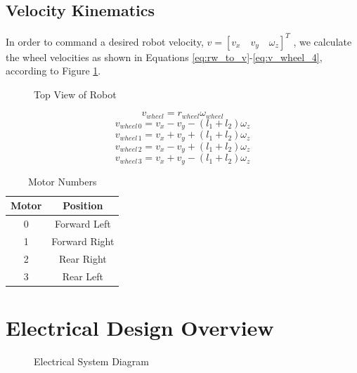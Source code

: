 \documentclass[letterpaper,12pt]{report}
\begin{document}
\subsection{Velocity Kinematics}
\label{sec:ar9331_vel_kin}

In order to command a desired robot velocity,
\begin{math}
    v= [ v_x \quad v_y \quad \omega_z ]^T
\end{math}
, we calculate the wheel velocities as shown in Equations
\ref{eq:rw_to_v}-\ref{eq:v_wheel_4}, according to Figure
\ref{fig:robot_top_view}.

\begin{figure}[h!]
  \centering
  
  \caption{Top View of Robot}
  \label{fig:robot_top_view}
\end{figure}

\begin{equation}
  v_{wheel}=r_{wheel}\omega_{wheel}
  \label{eq:rw_to_v}
\end{equation}
\begin{equation}
  v_{wheel\,0}=v_x-v_y-(l_1+l_2)\omega_z
  \label{eq:v_wheel_1}
\end{equation}
\begin{equation}
  v_{wheel\,1}=v_x+v_y+(l_1+l_2)\omega_z
  \label{eq:v_wheel_2}
\end{equation}
\begin{equation}
  v_{wheel\,2}=v_x-v_y+(l_1+l_2)\omega_z
  \label{eq:v_wheel_3}
\end{equation}
\begin{equation}
  v_{wheel\,3}=v_x+v_y-(l_1+l_2)\omega_z
  \label{eq:v_wheel_4}
\end{equation}

\begin{table}[h!]
  \centering
  \begin{tabular}{| c | c |}
    \hline
    \textbf{Motor} & \textbf{Position} \\
    \hline
    0 & Forward Left \\
    \hline
    1 & Forward Right \\
    \hline
    2 & Rear Right \\
    \hline
    3 & Rear Left \\
    \hline
  \end{tabular}
  \caption{Motor Numbers}
  \label{tab:motor_nums}
\end{table}

\section{Electrical Design Overview}
\begin{figure}[h!]
  \centering
  
  \caption{Electrical System Diagram}
  \label{fig:e_system}
\end{figure}
\end{document}
